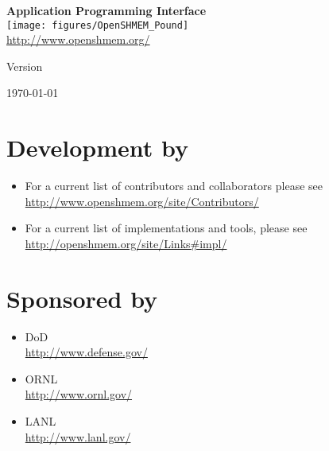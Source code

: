 \thispagestyle{empty}
\begin{center}
\textbf{\Huge \openshmem}
\par
\end{center}

\begin{center}
\textbf{\LARGE Application Programming Interface}\\
\texttt{[image: figures/OpenSHMEM\_Pound]}\\
\url{http://www.openshmem.org/}
\par
\end{center}

\begin{center}
Version \insertDocVersion
\par
\end{center}

\vspace{0.5in}
\begin{center}
\today
\end{center}

\vspace{0.5in}

\vfill{}

\section*{Development by}
\begin{itemize}
\item For a current list of contributors and collaborators please see\\
  \url{http://www.openshmem.org/site/Contributors/}
\item For a current list of \openshmem implementations and tools, please see\\
  \url{http://openshmem.org/site/Links#impl/}

\end{itemize}

\pagebreak{}

\section*{Sponsored by}
\begin{itemize}
\item \ac{DoD}\\
  \url{http://www.defense.gov/ }
\item \ac{ORNL}\\
  \url{http://www.ornl.gov/}
\item \ac{LANL}\\
  \url{http://www.lanl.gov/}
\end{itemize}


